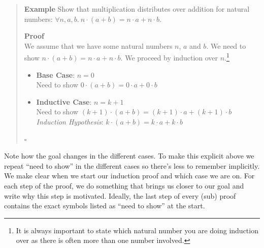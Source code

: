 \documentclass{tufte-handout}
\newcounter{example}
\newenvironment{example}
{\refstepcounter{example}\begin{quote}
\textbf{Example \arabic{example}}}
{

$\square$\end{quote}}
\begin{document}
\begin{example}\label{ex:distr}
  Show that multiplication distributes over addition for natural numbers:
  $\forall n,a,b.~n\cdot(a+b) = n\cdot a + n\cdot b$.

  \textbf{Proof}\\
  We assume that we have some natural numbers $n$, $a$ and $b$.
  We need to show $n\cdot(a+b) = n\cdot a + n\cdot b$.
  We proceed by induction over $n$.\footnote{It is always important
    to state which natural number you are doing induction over as
    there is often more than one number involved. }
  \begin{itemize}
  \item \textbf{Base Case}: $n = 0$ \\
    Need to show $0 \cdot (a + b) = 0 \cdot a + 0 \cdot b$
  \item \textbf{Inductive Case}: $n = k + 1$ \\
    Need to show
    $(k + 1) \cdot (a + b) = (k + 1) \cdot a + (k + 1) \cdot b$\\
    \textit{Induction Hypothesis}:
    $k \cdot (a + b) = k \cdot a + k \cdot b$
  \end{itemize}
\end{example}

\noindent
Note how the goal changes in the different cases. To make this
explicit above we repeat ``need to show'' in the different cases
so there's less to remember implicitly.
%
We make clear when we start our induction proof and which case we
are on. For each step of the proof, we do something that brings us
closer to our goal and write why this step is motivated. Ideally,
the last step of every (sub) proof contains the exact symbols
listed as ``need to show'' at the start.
\end{document}

